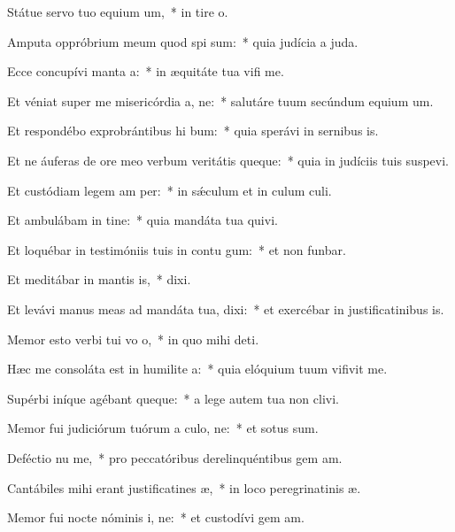 \item Státue servo tuo equium um,~* in tire o.
\item Amputa oppróbrium meum quod spi sum:~* quia judícia a juda.
\item Ecce concupívi manta a:~* in æquitáte tua vifi me.
\item Et véniat super me misericórdia a, ne:~* salutáre tuum secúndum equium um.
\item Et respondébo exprobrántibus hi bum:~* quia sperávi in sernibus is.
\item Et ne áuferas de ore meo verbum veritátis queque:~* quia in judíciis tuis suspevi.
\item Et custódiam legem am per:~* in sǽculum et in culum culi.
\item Et ambulábam in tine:~* quia mandáta tua quivi.
\item Et loquébar in testimóniis tuis in contu gum:~* et non funbar.
\item Et meditábar in mantis is,~*  dixi.
\item Et levávi manus meas ad mandáta tua,  dixi:~* et exercébar in justificatinibus is.
\item Memor esto verbi tui vo o,~* in quo mihi  deti.
\item Hæc me consoláta est in humilite a:~* quia elóquium tuum vifivit me.
\item Supérbi iníque agébant queque:~* a lege autem tua non clivi.
\item Memor fui judiciórum tuórum a culo, ne:~* et sotus sum.
\item Deféctio nu me,~* pro peccatóribus derelinquéntibus gem am.
\item Cantábiles mihi erant justificatines æ,~* in loco peregrinatinis æ.
\item Memor fui nocte nóminis i, ne:~* et custodívi gem am.
